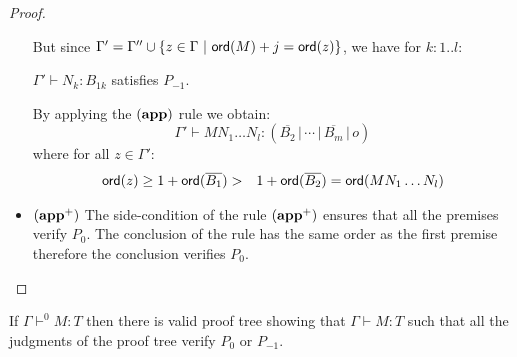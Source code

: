 \begin{proof}
\begin{itemize}
    But since $\Gamma' = \Gamma'' \cup \{ z \in \Gamma \ | \ {\sf ord}(M) + j = {\sf ord}(z)\}$, we have for $k : 1..l$:

    $\Gamma' \vdash N_k : B_{1k}$ satisfies $P_{-1}$.


    By applying  the $\mathbf{(app)}$ rule we obtain:
    $$\Gamma' \vdash M N_1 \ldots N_l : (\overline{B_2} \, | \, \cdots \, | \,
    \overline{B_m} \, | \, o)$$
    where for all $z\in \Gamma'$:
    \begin{eqnarray*}
    {\sf ord}(z) \geq 1 + {\sf ord}(\overline{B_1})
    &>& 1 + {\sf ord}(\overline{B_2}) = {\sf ord}(M N_1 \ldots N_l)
    \end{eqnarray*}

\item $\mathbf{(app^+)}$  The side-condition of the rule $\mathbf{(app^+)}$ ensures that all the premises
 verify $P_0$. The conclusion of the rule has the same order as the first premise
 therefore the conclusion verifies $P_0$.
\end{itemize}
\end{proof}


\begin{lem}
\label{lem:prooftree01only}
If $\Gamma \vdash^{0} M : T$ then there is valid proof tree
showing that $\Gamma \vdash M : T$ such that all the judgments
of the proof tree verify $P_0$ or $P_{-1}$.
\end{lem}



